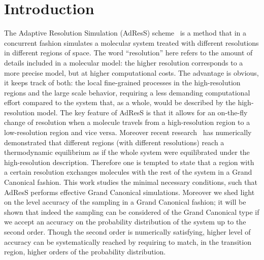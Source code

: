 \documentclass[aps,a4paper,reprint,onecolumn]{revtex4}
\begin{document}
\section{Introduction}
The Adaptive Resolution Simulation (AdResS) scheme~\cite{jcp,pre} is a
method that in a concurrent fashion simulates a molecular system treated with different
resolutions in different regions of space.  The word ``resolution''
here refers to the amount of details included in a molecular model: the higher 
resolution corresponds to a more precise model, but at higher computational costs. The advantage is obvious, it
keeps track of both: the local fine-grained processes in the
high-resolution regions and the large scale behavior, requiring a less demanding computational effort compared to the system that, as a
whole, would be described by the high-resolution model. The key feature of
AdResS is that it allows for an on-the-fly change of resolution when a
molecule travels from a high-resolution region to a low-resolution
region and vice versa. Moreover recent research~\cite{prlgc, rdfcorr}
has numerically demonstrated that different regions (with different resolutions) reach a
thermodynamic equilibrium as if the whole system were equilibrated
under the high-resolution description. Therefore one is tempted to state that a region with a
certain resolution exchanges molecules with the rest of the system in
a Grand Canonical fashion. This work
studies the minimal necessary conditions, such that AdResS
performs effective Grand Canonical simulations.  
Moreover we shed light on the level accuracy of
the sampling in a Grand Canonical fashion; it will be shown that indeed the sampling can be considered 
of the Grand Canonical type if we accept an accuracy on the probability distribution of the system up to the second order.
Though the second order is numerically satisfying, higher level of accuracy can be systematically reached by requiring to match, in the transition region, higher orders of the probability distribution.
\end{document}
